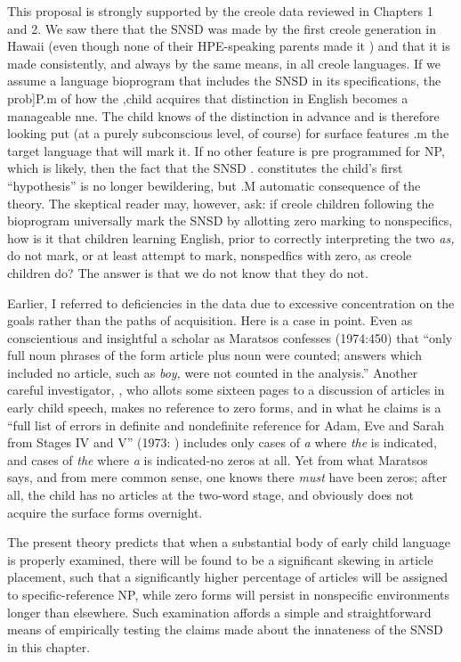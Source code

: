 This proposal is strongly supported by the creole data reviewed in Chapters 1 and 2. We saw there that the SNSD was made by the first creole generation in Hawaii (even though none of their HPE-speaking parents made it ) and that it is made consistently, and always by the same means, in all creole languages. If we assume a language bioprogram that includes the SNSD in its specifications, the prob]P.m of how the
,child acquires that distinction in English becomes a manageable nne. The child knows of the distinction in advance and is therefore looking put (at a purely subconscious level, of course) for surface features
.m the target language that will mark it. If no other feature is pre\-
programmed for NP, which is likely, then the fact that the SNSD
. constitutes the child's first ``hypothesis'' is no longer bewildering, but
.M automatic consequence of the theory.
The skeptical reader may, however, ask: if creole children follow\-ing the bioprogram universally mark the SNSD by allotting zero marking to nonspecifics, how is it that children learning English, prior to
correctly interpreting the two \textit{as,} do not mark, or at least attempt to mark, nonspedfics with zero, as creole children do? The answer is that we do not know that they do not.

Earlier, I referred to deficiencies in the data due to excessive
concentration on the goals rather than the paths of acquisition. Here is a case in point. Even as conscientious and insightful a scholar as Maratsos confesses (1974:450) that ``only full noun phrases of the form article plus noun were counted; answers which included no article, such as \textit{boy, }were not counted in the analysis.'' Another careful inves\-tigator, \citet{Brown1973}, who allots some sixteen pages to a discussion of articles in early child speech, makes no reference to zero forms, and in what he claims is a ``full list of errors in definite and nondefinite reference for Adam, Eve and Sarah from Stages IV and V'' (1973: ) includes only cases of \textit{a} where \textit{the} is indicated, and cases of \textit{the} where \textit{a} is indicated-no zeros at all. Yet from what Maratsos says, and from mere common sense, one knows there \textit{must} have been zeros; after all, the child has no articles at the two-word stage, and obviously does not acquire the surface forms overnight.

The present theory predicts that when a substantial body of early child language is properly examined, there will be found to be a significant skewing in article placement, such that a significantly higher percentage of articles will be assigned to specific-reference NP, while zero forms will persist in nonspecific environments longer than elsewhere. Such examination affords a simple and straightforward means of empirically testing the claims made about the innateness of the SNSD in this chapter.

